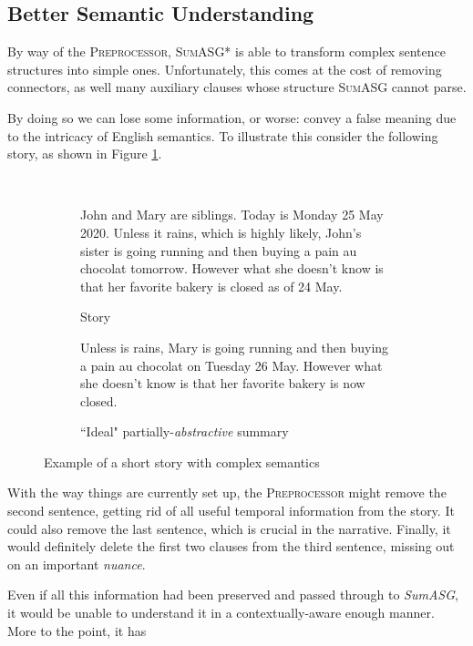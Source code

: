 \subsection{Better Semantic Understanding}

By way of the \textsc{Preprocessor}, \textsc{SumASG*} is able to transform complex sentence structures into simple ones. Unfortunately, this comes at the cost of removing connectors, as well many auxiliary clauses whose structure \textsc{SumASG} cannot parse.

By doing so we can lose some information, or worse: convey a false meaning due to the intricacy of English semantics. To illustrate this consider the following story, as shown in Figure \ref{fig:complex_summary}.

\begin{figure}[H]\
\begin{subfigure}{\textwidth}
\begin{displayquote}
John and Mary are siblings. Today is Monday 25 May 2020. Unless it rains, which is highly likely, John's sister is going running and then buying a pain au chocolat tomorrow. However what she doesn't know is that her favorite bakery is closed as of 24 May.
\end{displayquote}
\caption{Story}
\vspace{\baselineskip}
\end{subfigure}
\begin{subfigure}{\textwidth}
\begin{displayquote}
Unless is rains, Mary is going running and then buying a pain au chocolat on Tuesday 26 May. However what she doesn't know is that her favorite bakery is now closed.
\caption{``Ideal" partially-\textit{abstractive} summary}
\end{displayquote}
\end{subfigure}
\caption{Example of a short story with complex semantics}
\label{fig:complex_summary}
\end{figure}

With the way things are currently set up, the \textsc{Preprocessor} might remove the second sentence, getting rid of all useful temporal information from the story. It could also remove the last sentence, which is crucial in the narrative. Finally, it would definitely delete the first two clauses from the third sentence, missing out on an important \textit{nuance}.

Even if all this information had been preserved and passed through to \textit{SumASG}, it would be unable to understand it in a contextually-aware enough manner. More to the point, it has

